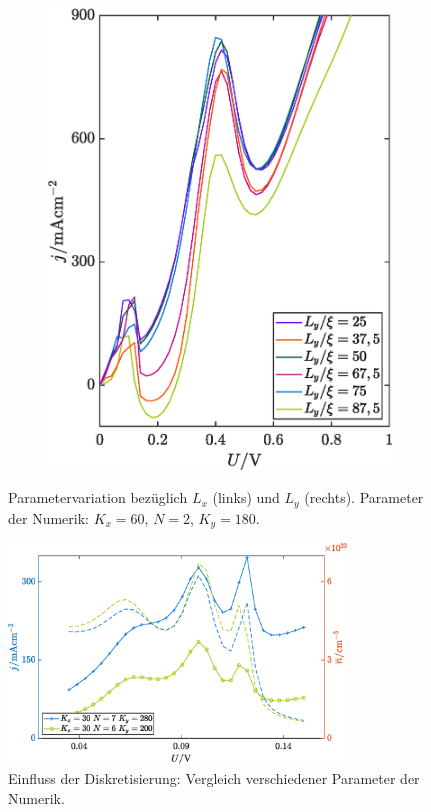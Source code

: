 \begin{figure}
\begin{subfigure}[b]{0.48\textwidth}
        \includegraphics[width=\textwidth]{plots/IV/IV_Ly_variation.eps}
        \label{fig:iv3_2}
    \end{subfigure}
    \caption[]
    {Parametervariation bezüglich $L_x$ (links) und $L_y$ (rechts). Parameter der Numerik: $K_x=60$, $N=2$, $K_y=180$.}
    \label{fig:iv_vergleich1}
\end{figure}

\begin{figure}
  \centering
  \includegraphics[width=0.8\textwidth]{plots/IV/IV_dg_vgl_diskretisierung_wide.eps}
  \caption{Einfluss der Diskretisierung: Vergleich verschiedener Parameter der Numerik.}
  \label{fig:iv4}
\end{figure}

